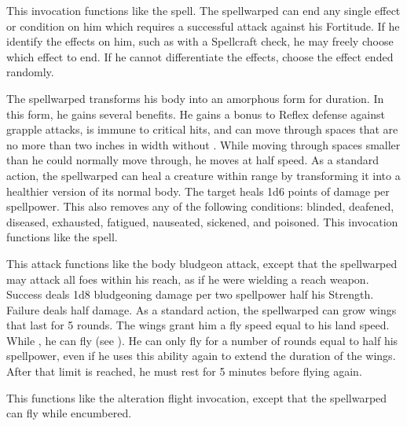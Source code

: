             This invocation functions like the  spell.
            The spellwarped can end any single effect or condition on him which requires a successful attack against his Fortitude.
            If he identify the effects on him, such as with a Spellcraft check, he may freely choose which effect to end.
            If he cannot differentiate the effects, choose the effect ended randomly.

            The spellwarped transforms his body into an amorphous form for \durshort duration.
            In this form, he gains several benefits.
            He gains a  bonus to Reflex defense against grapple attacks, is immune to critical hits, and can move through spaces that are no more than two inches in width without .
            While moving through spaces smaller than he could normally move through, he moves at half speed.
            As a standard action, the spellwarped can heal a creature within \rngclose range by transforming it into a healthier version of its normal body.
            The target heals 1d6 points of damage per spellpower.
            This also removes any of the following conditions: blinded, deafened, diseased, exhausted, fatigued, nauseated, sickened, and poisoned.
            This invocation functions like the  spell.

            This attack functions like the body bludgeon attack, except that the spellwarped may attack all foes within his reach, as if he were wielding a reach weapon.
            Success deals 1d8 bludgeoning damage per two spellpower \add half his Strength.
            Failure deals half damage.
            As a standard action, the spellwarped can grow wings that last for 5 rounds.
            The wings grant him a fly speed equal to his land speed.
            While , he can fly (see ).
            He can only fly for a number of rounds equal to half his spellpower, even if he uses this ability again to extend the duration of the wings.
            After that limit is reached, he must rest for 5 minutes before flying again.

            This functions like the alteration flight invocation, except that the spellwarped can fly while encumbered.

